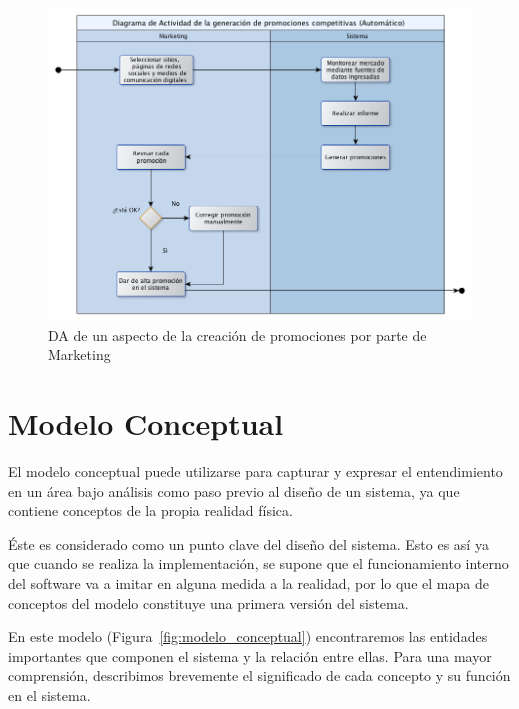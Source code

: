 \begin{figure}[h!]
  \centering
  \includegraphics[width=1\textwidth]{./imagenes/da_marketing.png}
  \caption{DA de un aspecto de la creación de promociones por parte de Marketing}
  \label{fig:da_marketing}
\end{figure}

\clearpage

\section{Modelo Conceptual}

El modelo conceptual puede utilizarse para capturar y expresar el entendimiento en un área bajo análisis como paso previo al diseño de un sistema, ya que contiene conceptos de la propia realidad física.

Éste es considerado como un punto clave del diseño del sistema. Esto es así ya que cuando se realiza la implementación, se supone que el funcionamiento interno del software va a imitar en alguna medida a la realidad, por lo que el mapa de conceptos del modelo constituye una primera versión del sistema.

En este modelo (Figura~\ref{fig:modelo_conceptual}) encontraremos las entidades importantes que componen el sistema y la relación entre ellas.
Para una mayor comprensión, describimos brevemente el significado de cada concepto y su función en el sistema.


